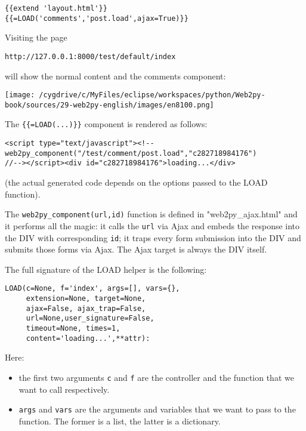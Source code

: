 \documentclass[justified,sixbynine,notoc]{tufte-book}
\def\ft{\small\tt}
\begin{document}
\begin{fullwidth}
\begin{lstlisting}[keywords={}]
{{extend 'layout.html'}}
{{=LOAD('comments','post.load',ajax=True)}}
\end{lstlisting}

Visiting the page

\begin{lstlisting}[keywords={}]
http://127.0.0.1:8000/test/default/index
\end{lstlisting}
\noindent will show the normal content and the comments component:


\goodbreak\begin{center}\texttt{[image: /cygdrive/c/MyFiles/eclipse/workspaces/python/Web2py-book/sources/29-web2py-english/images/en8100.png]}\end{center}


The {\ft \{\{=LOAD(...)\}\}} component is rendered as follows:

\begin{lstlisting}[keywords={}]
<script type="text/javascript"><!--
web2py_component("/test/comment/post.load","c282718984176")
//--></script><div id="c282718984176">loading...</div>
\end{lstlisting}

(the actual generated code depends on the options passed to the LOAD function).

The {\ft web2py\_component(url,id)} function is defined in "web2py\_ajax.html" and it performs all the magic: it calls the {\ft url} via Ajax and embeds the response into the DIV with corresponding {\ft id}; it traps every form submission into the DIV and submits those forms via Ajax. The Ajax target is always the DIV itself.

The full signature of the LOAD helper is the following:

\begin{lstlisting}
LOAD(c=None, f='index', args=[], vars={},
     extension=None, target=None,
     ajax=False, ajax_trap=False,
     url=None,user_signature=False,
     timeout=None, times=1,
     content='loading...',**attr):
\end{lstlisting}

Here:
\begin{itemize}
\item the first two arguments {\ft c} and {\ft f} are the controller and the function that we want to call respectively.

\item {\ft args} and {\ft vars} are the arguments and variables that we want to pass to the function. The former is a list, the latter is a dictionary.


\end{itemize}
\end{fullwidth}
\end{document}
